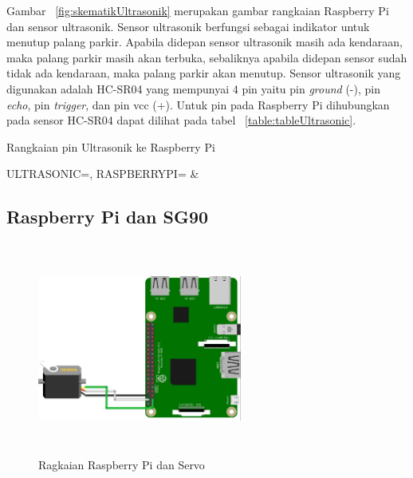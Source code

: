 Gambar ~\ref{fig:skematikUltrasonik} merupakan gambar rangkaian Raspberry Pi dan sensor ultrasonik. Sensor ultrasonik berfungsi sebagai indikator untuk menutup palang parkir. Apabila didepan sensor ultrasonik masih ada kendaraan, maka palang parkir masih akan terbuka, sebaliknya apabila didepan sensor sudah tidak ada kendaraan, maka palang parkir akan menutup. Sensor ultrasonik yang digunakan adalah HC-SR04 yang mempunyai 4 pin yaitu pin \textit{ground} (-), pin \textit{echo}, pin \textit{trigger}, dan pin vcc (+). Untuk pin pada Raspberry Pi dihubungkan pada sensor HC-SR04 dapat dilihat pada tabel ~\ref{table:tableUltrasonic}.

\begin{atable}
    \caption{Rangkaian pin Ultrasonik ke Raspberry Pi}
    \label{table:tableUltrasonic}
        {
            ULTRASONIC=\ULTRASONIC, 
            RASPBERRYPI=\RASPBERRYPI}
        {
            \ULTRASONIC & 
            \RASPBERRYPI}
\end{atable}

\subsection{Raspberry Pi dan SG90}
\begin{figure} [H]
    \includegraphics[height=7cm, width=0.6\textwidth, center]{images/skematik_servo.jpg}
    \caption{Ragkaian Raspberry Pi dan Servo}
    \label{fig:skematikServo}
\end{figure}

